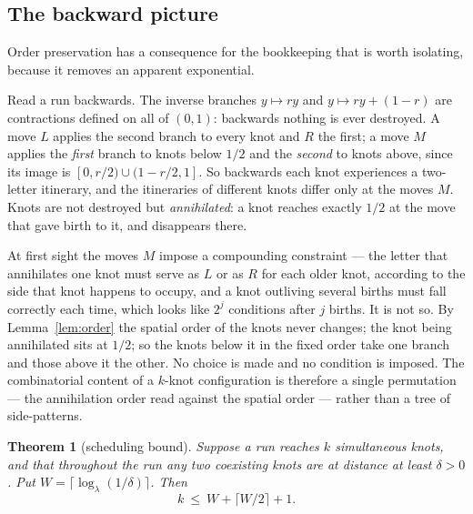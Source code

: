 \documentclass[11pt,reqno]{amsart}
\theoremstyle{plain}
\newtheorem{theorem}{Theorem}
\theoremstyle{definition}
\theoremstyle{remark}
\begin{document}
\subsection{The backward picture}
Order preservation has a consequence for the bookkeeping that is worth
isolating, because it removes an apparent exponential.

Read a run backwards. The inverse branches $y\mapsto ry$ and
$y\mapsto ry+(1-r)$ are contractions defined on all of $(0,1)$: backwards
nothing is ever destroyed. A move $L$ applies the second branch to every knot
and $R$ the first; a move $M$ applies the \emph{first} branch to knots below
$1/2$ and the \emph{second} to knots above, since its image is
$[0,r/2)\cup(1-r/2,1]$. So backwards each knot experiences a two-letter
itinerary, and the itineraries of different knots differ only at the moves
$M$. Knots are not destroyed but \emph{annihilated}: a knot reaches exactly
$1/2$ at the move that gave birth to it, and disappears there.

At first sight the moves $M$ impose a compounding constraint --- the letter
that annihilates one knot must serve as $L$ or as $R$ for each older knot,
according to the side that knot happens to occupy, and a knot outliving several
births must fall correctly each time, which looks like $2^{j}$ conditions after
$j$ births. It is not so. By Lemma~\ref{lem:order} the spatial order of the
knots never changes; the knot being annihilated sits at $1/2$; so the knots
below it in the fixed order take one branch and those above it the other. No
choice is made and no condition is imposed. The combinatorial content of a
$k$-knot configuration is therefore a single permutation --- the annihilation
order read against the spatial order --- rather than a tree of side-patterns.

\begin{theorem}[scheduling bound]\label{thm:schedule}
Suppose a run reaches $k$ simultaneous knots, and that throughout the run any
two coexisting knots are at distance at least $\delta>0$. Put
$W=\lceil\log_\lambda(1/\delta)\rceil$. Then
\[
  k\ \leq\ W+\lceil W/2\rceil+1.
\]
\end{theorem}
\end{document}
